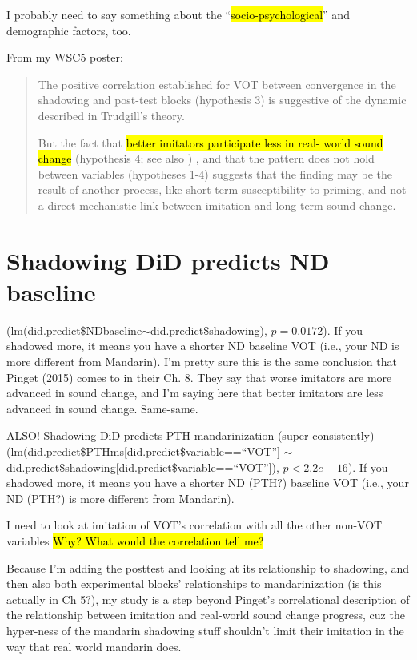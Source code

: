     I probably need to say something about the ``\hl{socio-psychological}'' and demographic factors, too. 
    
    From my WSC5 poster:
    \begin{quote}
        The positive correlation established for VOT between convergence in the shadowing and post-test blocks%
        (hypothesis 3) is suggestive of the dynamic described in Trudgill’s theory.
        
        But the fact that \hl{better imitators participate less in real- world sound change} (hypothesis 4; see also \citet{pinget2015actuation})%
        , and that the pattern does not hold between variables (hypotheses 1-4) %
        suggests that the finding may be the result of another process, like short-term susceptibility to priming, and not a direct mechanistic link between imitation and long-term sound change.
    \end{quote}
    
    \section{Shadowing DiD predicts ND baseline} (lm(did.predict\$NDbaseline$\sim$did.predict\$shadowing), $p=0.0172$). If you shadowed more, it means you have a shorter ND baseline VOT (i.e., your ND is more different from Mandarin). %
    I'm pretty sure this is the same conclusion that Pinget (2015) comes to in their Ch. 8. They say that worse imitators are more advanced in sound change, and I'm saying here that better imitators are less advanced in sound change. Same-same.

    ALSO! Shadowing DiD predicts PTH mandarinization (super consistently) \newline(lm(did.predict\$PTHms[did.predict\$variable==``VOT''] $\sim$ \newline did.predict\$shadowing[did.predict\$variable==``VOT'']), $p<2.2e-16$). If you shadowed more, it means you have a shorter ND (PTH?) baseline VOT (i.e., your ND (PTH?) is more different from Mandarin).
    
    I need to look at imitation of VOT's correlation with all the other non-VOT variables \hl{Why? What would the correlation tell me?}
    
    Because I'm adding the posttest and looking at its relationship to shadowing, and then also both experimental blocks' relationships to mandarinization (is this actually in Ch 5?), my study is a step beyond Pinget's correlational description of the relationship between imitation and real-world sound change progress, cuz the hyper-ness of the mandarin shadowing stuff shouldn't limit their imitation in the way that real world mandarin does.